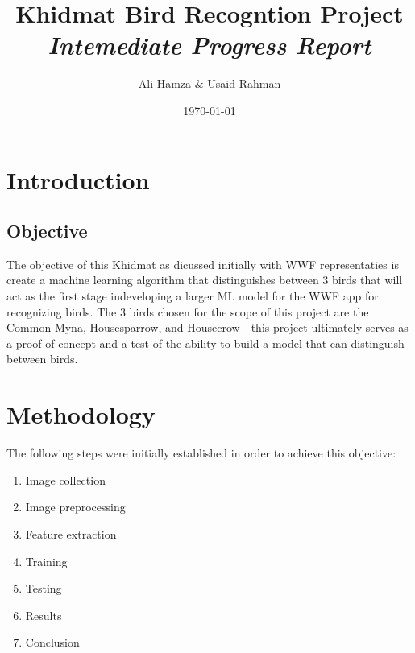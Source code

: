 \documentclass{article}
\title{Khidmat Bird Recogntion Project\\ \textit{Intemediate Progress Report}}
\author{Ali Hamza $\&$ Usaid Rahman}
\date{\today}
\begin{document}
    \maketitle
    \section*{Introduction}
    \subsection*{Objective}
    The objective of this Khidmat as dicussed initially with WWF representaties is create a machine learning algorithm that distinguishes between 3 birds that will act as the first stage indeveloping a larger ML model for the WWF app for recognizing birds. The 3 birds chosen for the scope of this project are the Common Myna, Housesparrow, and Housecrow - this project ultimately serves as a proof of concept and a test of the ability to build a model that can distinguish between birds.

    \section*{Methodology}
    The following steps were initially established in order to achieve this objective:
    
    \begin{enumerate}
        \item Image collection
        \item Image preprocessing
        \item Feature extraction
        \item Training
        \item Testing
        \item Results
        \item Conclusion
    \end{enumerate}
\end{document}
